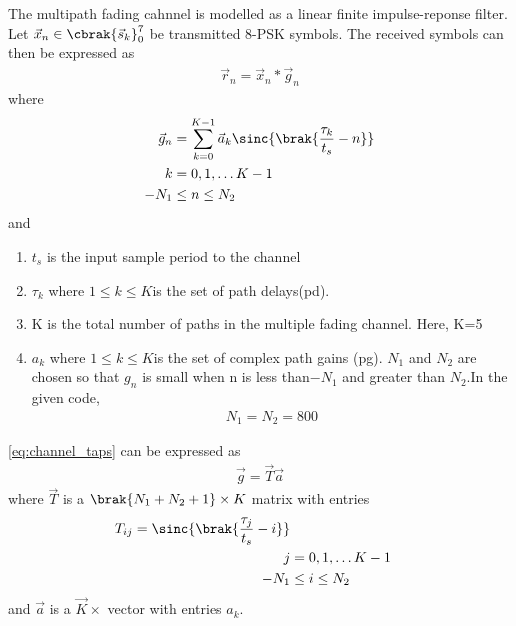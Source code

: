 
The multipath fading cahnnel is modelled as a linear finite impulse-reponse filter.
Let $\vec{x}_n \in \cbrak{\vec{s}_k}_{0}^{7}$ be transmitted 8-PSK symbols.  The received symbols can then be expressed as
\begin{align}
\vec{r}_n = \vec{x}_n * \vec{g}_n
\end{align}
where
\begin{align}
\label{eq:channel_taps}
\vec{g}_n &= 
\sum_{k=0}^{K-1}\vec{a}_k \sinc{\brak{\frac{\tau_k}{t_s}-n}}
\\
k &= 0, 1, \dots K-1
\\
-N_1 &\leq n \leq N_2
\end{align}
and
\begin{enumerate}
\item $t_s$ is the input sample period to the channel
\item $\tau_k$ where $1\leq k \leq K$is the set of path delays(pd).
\item K is the total number of paths in the multiple fading channel. Here, K=5 
\item $a_k$ where $1\leq k \leq K$is the set of complex path gains (pg).
$N_1$ and $N_2$ are chosen so that $g_n$ is small when n is less than$-N_1$ and greater than $N_2$.In the given code,
\begin{align}
N_1=N_2=800
\end{align}
\end{enumerate}
\eqref{eq:channel_taps} can be expressed as
\begin{align}
\label{eq:channel_taps_mat}
\vec{g}=
\vec{T}\vec{a}
\end{align}
where $\vec{T}$ is a $\brak{N_1+N_2+1}\times K$ matrix with entries
\begin{align}
T_{ij} = \sinc{\brak{\frac{\tau_j}{t_s}-i}}
\\
j &= 0, 1, \dots K-1
\\
-N_1 &\leq i \leq N_2
\end{align}
and $\vec{a}$ is a $\vec{K}\times$ vector with entries $a_k$.
